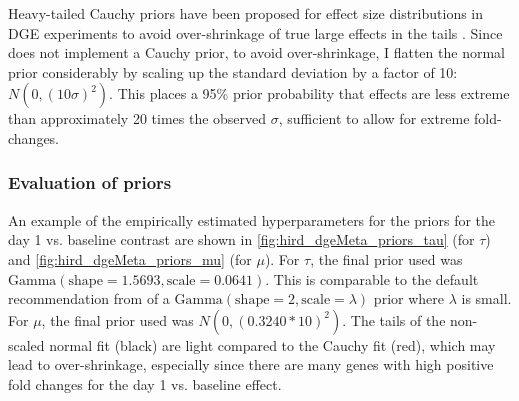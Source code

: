 Heavy-tailed Cauchy priors have been proposed for effect size distributions in \gls{DGE} experiments to avoid over-shrinkage of true large effects in the tails \autocite{zhu2019HeavytailedPriorDistributions}.
Since  does not implement a Cauchy prior, to avoid over-shrinkage, I flatten the normal prior considerably by scaling up the standard deviation by a factor of 10: $N(0, (10\sigma)^2)$.
This places a 95\% prior probability that effects are less extreme than approximately 20 times the observed $\sigma$, sufficient to allow for extreme fold-changes.

\subsubsection{Evaluation of priors}

An example of the empirically estimated hyperparameters for the priors for the day 1 vs. baseline contrast are shown in \cref{fig:hird_dgeMeta_priors_tau} (for $\tau$) and \cref{fig:hird_dgeMeta_priors_mu} (for $\mu$).
For $\tau$, the final prior used was $\text{Gamma}(\text{shape}=1.5693, \text{scale}=0.0641)$.
This is comparable to the default recommendation from \textcite{chung2013NondegeneratePenalizedLikelihood} of a $\text{Gamma}(\text{shape}=2, \text{scale}=\lambda)$ prior where $\lambda$ is small.
For $\mu$, the final prior used was $N(0, (0.3240*10)^2)$.
The tails of the non-scaled normal fit (black) are light compared to the Cauchy fit (red), which may lead to over-shrinkage, especially since there are many genes with high positive fold changes for the day 1 vs. baseline effect.

